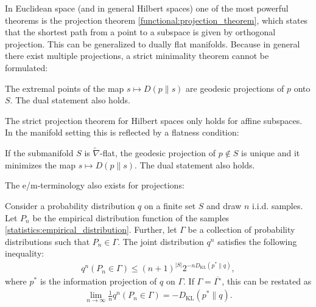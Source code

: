     In Euclidean space (and in general Hilbert spaces) one of the most powerful theorems is the projection theorem \ref{functional:projection_theorem}, which states that the shortest path from a point to a subspace is given by orthogonal projection. This can be generalized to dually flat manifolds.
    Because in general there exist multiple projections, a strict minimality theorem cannot be formulated:
    \begin{theorem}
        The extremal points of the map $s\mapsto D(p\|s)$ are geodesic projections of $p$ onto $S$. The dual statement also holds.
    \end{theorem}
    The strict projection theorem for Hilbert spaces only holds for affine subspaces. In the manifold setting this is reflected by a flatness condition:
    \begin{property}
        If the submanifold $S$ is $\widetilde{\nabla}$-flat, the geodesic projection of $p\not\in S$ is unique and it minimizes the map $s\mapsto D(p\|s)$. The dual statement also holds.
    \end{property}

    The e/m-terminology also exists for projections:

    \begin{theorem}[Sanov]
        Consider a probability distribution $q$ on a finite set $S$ and draw $n$ i.i.d. samples. Let $P_n$ be the empirical distribution function of the samples \eqref{statistics:empirical_distribution}. Further, let $\Gamma$ be a collection of probability distributions such that $P_n\in\Gamma$. The joint distribution $q^n$ satisfies the following inequality:
        \begin{gather}
            q^n(P_n\in\Gamma) \leq (n+1)^{|S|}2^{-n D_\mathrm{KL}(p^*\|q)},
        \end{gather}
        where $p^*$ is the information projection of $q$ on $\Gamma$. If $\Gamma=\overline{\Gamma^\circ}$, this can be restated as
        \begin{gather}
            \lim_{n\rightarrow\infty}\frac{1}{n}q^n(P_n\in\Gamma) = - D_\mathrm{KL}(p^*\|q).
        \end{gather}
    \end{theorem}